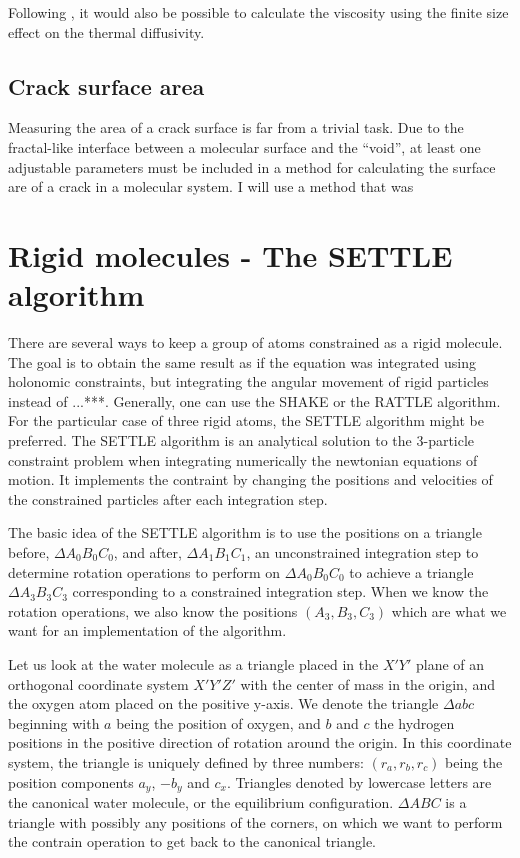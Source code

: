 Following \cite{Yeh2004}, it would also be possible to calculate the viscosity using the finite size effect on the thermal diffusivity.

\subsection{Crack surface area}
Measuring the area of a crack surface is far from a trivial task. Due to the fractal-like interface between a molecular surface and the ``void'', at least one adjustable parameters must be included in a method for calculating the surface are of a crack in a molecular system. I will use a method that was 



\section{Rigid molecules - The SETTLE algorithm}
There are several ways to keep a group of atoms constrained as a rigid molecule. The goal is to obtain the same result as if the equation was integrated using holonomic constraints, but integrating the angular movement of rigid particles instead of ...***. Generally, one can use the SHAKE or the RATTLE algorithm. For the particular case of three rigid atoms, the SETTLE algorithm might be preferred. The SETTLE algorithm \cite{Miyamoto1992} is an analytical solution to the 3-particle constraint problem when integrating numerically the newtonian equations of motion. It implements the contraint by changing the positions and velocities of the constrained particles after each integration step.

The basic idea of the SETTLE algorithm is to use the positions on a triangle before, $\Delta A_0 B_0 C_0$, and after, $\Delta A_1 B_1 C_1$, an unconstrained integration step to determine rotation operations to perform on $\Delta A_0 B_0 C_0$ to achieve a triangle $\Delta A_3 B_3 C_3$ corresponding to a constrained integration step. When we know the rotation operations, we also know the positions $(A_3, B_3, C_3)$ which are what we want for an implementation of the algorithm.

Let us look at the water molecule as a triangle placed in the $X'Y'$ plane of an orthogonal coordinate system $X'Y'Z'$	with the center of mass in the origin, and the oxygen atom placed on the positive y-axis. We denote the triangle $\Delta abc$ beginning with $a$ being the position of oxygen, and $b$ and $c$ the hydrogen positions in the positive direction of rotation around the origin.  In this coordinate system, the triangle is uniquely defined by three numbers: $(r_a, r_b, r_c)$ being the position components $a_y$, $-b_y$ and $c_x$. Triangles denoted by lowercase letters are the canonical water molecule, or the equilibrium configuration. $\Delta ABC$ is a triangle with possibly any positions of the corners, on which we want to perform the contrain operation to get back to the canonical triangle. 

